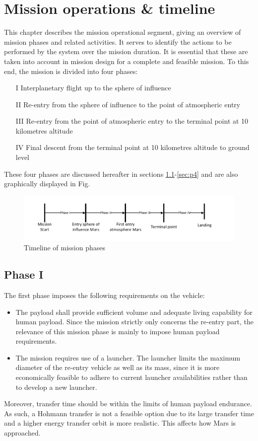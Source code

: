 \section{Mission operations \& timeline}\label{cha:opseg}
This chapter describes the mission operational segment, giving an overview of mission phases and related activities. It serves to identify the actions to be performed by the system over the mission duration. It is essential that these are taken into account in mission design for a complete and feasible mission. To this end, the mission is divided into four phases: 
\begin{itemize}
\item[I]{Interplanetary flight up to the sphere of influence}
\item[II]{Re-entry from the sphere of influence to the point of atmospheric entry}
\item[III]{Re-entry from the point of atmospheric entry to the terminal point at 10 kilometres altitude}
\item[IV]{Final descent from the terminal point at 10 kilometres altitude to ground level}
\end{itemize}
These four phases are discussed hereafter in sections \ref{sec:p1}-\ref{sec:p4} and are also graphically displayed in Fig. 

\begin{figure}[H]
\centering
\includegraphics[width = 1.0\textwidth]{Figure/OPS.pdf}
\caption{Timeline of mission phases}
\label{fig:time}
\end{figure}

\subsection{Phase I}\label{sec:p1}
The first phase imposes the following requirements on the vehicle:
\begin{itemize}
\item The payload shall provide sufficient volume and adequate living capability for human payload. Since the mission strictly only concerns the re-entry part, the relevance of this mission phase is mainly to impose human payload requirements. 
\item  The mission requires use of a launcher. The launcher limits the maximum diameter of the re-entry vehicle as well as its mass, since it is more economically feasible to adhere to current launcher availabilities rather than to develop a new launcher.
\end{itemize}
Moreover, transfer time should be within the limits of human payload endurance. As such, a Hohmann transfer is not a feasible option due to its large transfer time and a higher energy transfer orbit is more realistic. This affects how Mars is approached.

